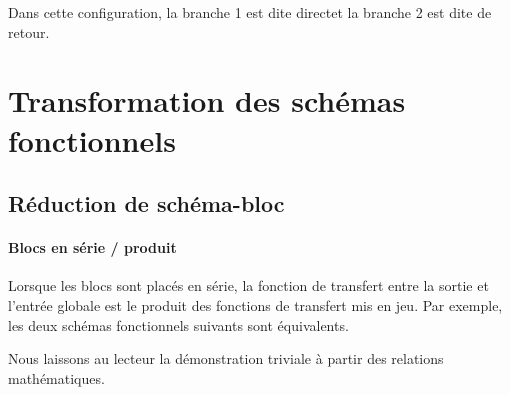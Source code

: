 Dans cette configuration, la branche 1 est dite \og direct\fg et la branche 2 est dite de \og retour\fg.

\section{Transformation des schémas fonctionnels}

\subsection{Réduction de schéma-bloc}

\paragraph{Blocs en série / produit}
Lorsque les blocs sont placés en série, la fonction de transfert 
entre la sortie et l'entrée globale est le produit des fonctions de transfert mis en jeu.
Par exemple, les deux schémas fonctionnels suivants sont équivalents.

\begin{center}

\end{center}

Nous laissons au lecteur la démonstration triviale à partir des relations mathématiques.


